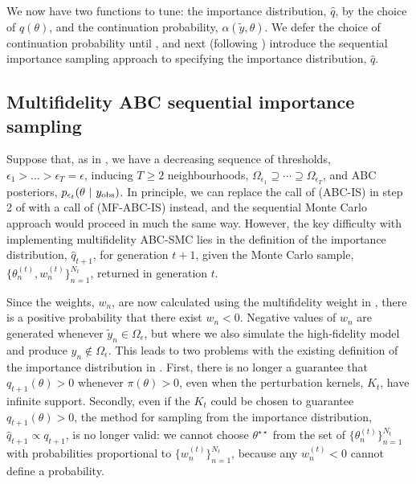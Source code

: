 \documentclass[review]{siamonline190516}
\begin{document}
We now have two functions to tune: the importance distribution, $\hat q$, by the choice of $q(\theta)$, and the continuation probability, $\alpha(\tilde y, \theta)$.
We defer the choice of continuation probability until , and next (following ) introduce the sequential importance sampling approach to specifying the importance distribution, $\hat q$.

\subsection{Multifidelity ABC sequential importance sampling}
\label{s:MF-ABC-SIS}

Suppose that, as in , we have a decreasing sequence of thresholds, $\epsilon_1 > \dots > \epsilon_T = \epsilon$, inducing $T \geq 2$ neighbourhoods, $\Omega_{\epsilon_1} \supseteq \cdots \supseteq \Omega_{\epsilon_T}$, and ABC posteriors, $p_{\epsilon_t}(\theta~|~y_{\mathrm{obs}})$.
In principle, we can replace the call of  (ABC-IS) in step 2 of  with a call of  (MF-ABC-IS) instead, and the sequential Monte Carlo approach would proceed in much the same way.
However, the key difficulty with implementing multifidelity ABC-SMC lies in the definition of the importance distribution, $\hat q_{t+1}$, for generation $t+1$, given the Monte Carlo sample, $\{ \theta_n^{(t)}, w_n^{(t)} \}_{n=1}^{N_t}$, returned in generation $t$. 

Since the weights, $w_n$, are now calculated using the multifidelity weight in , there is a positive probability that there exist $w_n < 0$.
Negative values of $w_n$ are generated whenever $\tilde y_n \in \Omega_\epsilon$, but where we also simulate the high-fidelity model and produce $y_n \notin \Omega_\epsilon$.
This leads to two problems with the existing definition of the importance distribution in .
First, there is no longer a guarantee that $q_{t+1}(\theta) > 0$ whenever $\pi(\theta)>0$, even when the perturbation kernels, $K_t$, have infinite support.
Secondly, even if the $K_t$ could be chosen to guarantee $q_{t+1}(\theta)>0$, the method for sampling from the importance distribution, $\hat q_{t+1} \propto q_{t+1}$, is no longer valid: 
we cannot choose $\theta^{\star \star}$ from the set of $\{ \theta_n^{(t)} \}_{n=1}^{N_t}$ with probabilities proportional to $\{ w_n^{(t)} \}_{n=1}^{N_t}$, because any $w_n^{(t)} < 0$ cannot define a probability.
\end{document}

